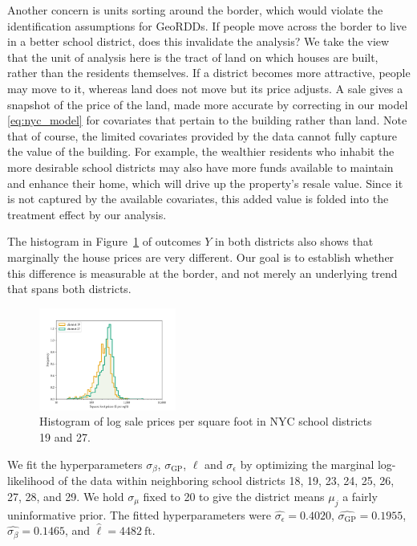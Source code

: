 \documentclass[letter,12pt]{article}
\newcommand{\sigmaf}{\sigma_{\mathrm{GP}}}
\newcommand{\sigman}{\sigma_{\epsilon}}
\newcommand{\sigmamu}{\sigma_{\mu}}
\begin{document}
Another concern is units sorting around the border, which would violate the identification assumptions for GeoRDDs.
If people move across the border to live in a better school district, does this invalidate the analysis?
We take the view that the unit of analysis here is the tract of land on which houses are built, rather than the residents themselves.
If a district becomes more attractive, people may move to it, whereas land does not move but its price adjusts.
A sale gives a snapshot of the price of the land, made more accurate by correcting in our model \eqref{eq:nyc_model} for covariates that pertain to the building rather than land.
Note that of course, the limited covariates provided by the data cannot fully capture the value of the building.
For example, the wealthier residents who inhabit the more desirable school districts may also have more funds available to maintain and enhance their home, which will drive up the property's resale value.
Since it is not captured by the available covariates, this added value is folded into the treatment effect by our analysis.

The histogram in Figure~\ref{fig:NYC_histogram} of outcomes \(Y\) in both districts also shows that marginally the house prices are very different.
Our goal is to establish whether this difference is measurable at the border, and not merely an underlying trend that spans both districts.

\begin{figure}[tbp]
    \centering
    \includegraphics[width=0.4\textwidth]{../NYC/NYC_plots/sales_histogram_19-27.png}
    \caption{\label{fig:NYC_histogram}Histogram of log sale prices per square foot in NYC school districts 19 and 27.}
\end{figure}



We fit the hyperparameters \(\sigma_\beta\), \(\sigmaf\), \(\ell\) and \(\sigman\) by optimizing the marginal log-likelihood of the data within neighboring school districts 18, 19, 23, 24, 25, 26, 27, 28, and 29.
We hold \(\sigmamu\) fixed to 20 to give the district means \(\mu_j\) a fairly uninformative prior.
The fitted hyperparameters were \(\widehat{\sigman}=0.4020\), \(\widehat{\sigmaf}=0.1955\), \(\widehat{\sigma_\beta}=0.1465\), and \(\widehat{\ell}=4482~\text{ft}\).
\end{document}
